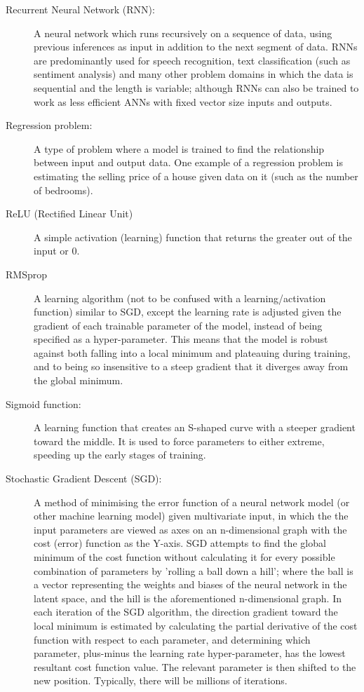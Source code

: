 \documentclass[]{report}
\begin{document}
\begin{description}
\item[Recurrent Neural Network (RNN):] A neural network which runs recursively on a sequence of data, using previous inferences as input in addition to the next segment of data. RNNs are predominantly used for speech recognition, text classification (such as sentiment analysis) and many other problem domains in which the data is sequential and the length is variable; although RNNs can also be trained to work as less efficient ANNs with fixed vector size inputs and outputs.

\item[Regression problem:] A type of problem where a model is trained to find the relationship between input and output data. One example of a regression problem is estimating the selling price of a house given data on it (such as the number of bedrooms).	

\item[ReLU (Rectified Linear Unit)] A simple activation (learning) function that returns the greater out of the input or 0.

\item[RMSprop] A learning algorithm (not to be confused with a learning/activation function) similar to SGD, except the learning rate is adjusted given the gradient of each trainable parameter of the model, instead of being specified as a hyper-parameter. This means that the model is robust against both falling into a local minimum and plateauing during training, and to being so insensitive to a steep gradient that it diverges away from the global minimum.

\item[Sigmoid function:] A learning function that creates an S-shaped curve with a steeper gradient toward the middle. It is used to force parameters to either extreme, speeding up the early stages of training.

\label{itm:SGD}
\item[Stochastic Gradient Descent (SGD):] A method of minimising the error function of a neural network model (or other machine learning model) given multivariate input, in which the the input parameters are viewed as axes on an n-dimensional graph with the cost (error) function as the Y-axis. SGD attempts to find the global minimum of the cost function without calculating it for every possible combination of parameters by 'rolling a ball down a hill'; where the ball is a vector representing the weights and biases of the neural network in the latent space, and the hill is the aforementioned n-dimensional graph. In each iteration of the SGD algorithm, the direction gradient toward the local minimum is estimated by calculating the partial derivative of the cost function with respect to each parameter, and determining which parameter, plus-minus the learning rate hyper-parameter, has the lowest resultant cost function value. The relevant parameter is then shifted to the new position. Typically, there will be millions of iterations.


\end{description}
\end{document}

